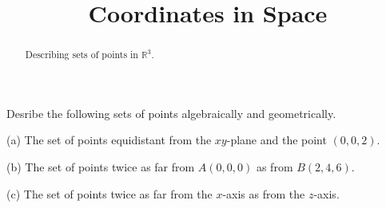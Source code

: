 \documentclass{ximera}
\title{Coordinates in Space}
\begin{document}
\begin{abstract}
Describing sets of points in $\mathbb{R}^3$.
\end{abstract}
\maketitle


Desribe the following sets of points algebraically and geometrically.

(a) The set of points equidistant from the $xy$-plane and the point $(0,0,2)$.

(b) The set of points twice as far from $A(0,0,0)$ as from $B(2,4,6)$.

(c) The set of points twice as far from the $x$-axis as from the $z$-axis.


 
\begin{onlineOnly}
    \begin{center}
\end{center}
\end{onlineOnly}
\end{document}

